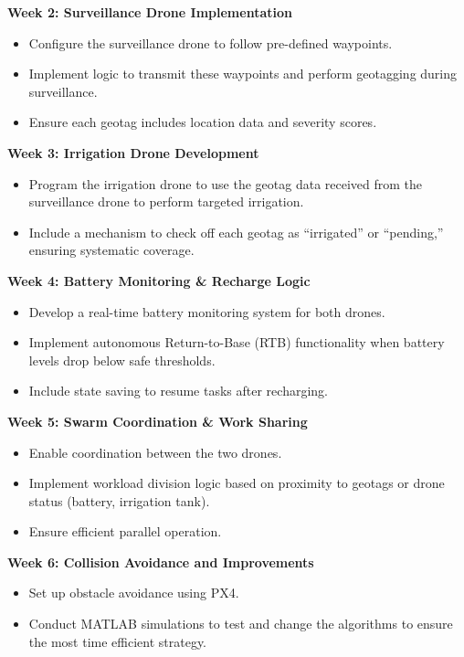 \documentclass[12pt]{article}
\begin{document}
\textbf{Week 2: Surveillance Drone Implementation} \par
\begin{itemize}
    \item Configure the surveillance drone to follow pre-defined waypoints.
    \item Implement logic to transmit these waypoints and perform geotagging during surveillance.
    \item Ensure each geotag includes location data and severity scores.
\end{itemize}

\textbf{Week 3: Irrigation Drone Development} \par
\begin{itemize}
    \item Program the irrigation drone to use the geotag data received from the surveillance drone to perform targeted irrigation.
    \item Include a mechanism to check off each geotag as ``irrigated'' or ``pending,'' ensuring systematic coverage.
\end{itemize}

\textbf{Week 4: Battery Monitoring \& Recharge Logic} \par
\begin{itemize}
    \item Develop a real-time battery monitoring system for both drones.
    \item Implement autonomous Return-to-Base (RTB) functionality when battery levels drop below safe thresholds.
    \item Include state saving to resume tasks after recharging.
\end{itemize}

\textbf{Week 5: Swarm Coordination \& Work Sharing} \par
\begin{itemize}
    \item Enable coordination between the two drones.
    \item Implement workload division logic based on proximity to geotags or drone status (battery, irrigation tank).
    \item Ensure efficient parallel operation.
\end{itemize}

\textbf{Week 6: Collision Avoidance and Improvements} \par
\begin{itemize}
    
    \item Set up obstacle avoidance using PX4.
    \item Conduct MATLAB simulations to test and change the algorithms to ensure the most time efficient strategy.
\end{itemize}
\end{document}
